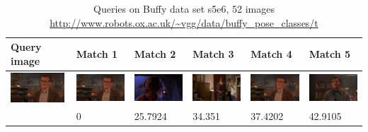\documentclass[10pt,a4paper]{article}
\begin{document}
\begin{table}
    \caption{Queries on Buffy data set s5e6, 52 images \url{http://www.robots.ox.ac.uk/~vgg/data/buffy_pose_classes/t}}
    \label{tab:buffyQueries}
    \begin{tabular}{|l|l|l|l|l|l|}
        \hline
        Query image & Match 1 & Match 2 & Match 3 & Match 4 & Match 5 \\ \hline

        \includegraphics[width=20mm]{queries/015663.jpg} &	
	\includegraphics[width=20mm]{queries/015663.jpg} &	
	\includegraphics[width=20mm]{queries/019018.jpg}  &
	\includegraphics[width=20mm]{queries/012194.jpg}  &
	\includegraphics[width=20mm]{queries/015742.jpg} &
	\includegraphics[width=20mm]{queries/022108.jpg} \\ 
	~ & 0 & 25.7924 & 34.351 &  37.4202 & 42.9105 \\ \hline


\end{tabular}
\end{table}
\end{document}
